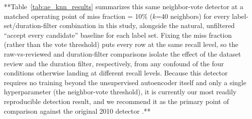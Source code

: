 \documentclass[preprint,NumberedRefs]{JASAnew}
\begin{document}
**Table~\ref{tab:ae_knn_results} summarizes this same neighbor-vote detector at a
matched operating point of miss fraction = 10\% ($k$=40 neighbors) for every
label-set/duration-filter combination in this study, alongside the natural,
unfiltered ``accept every candidate'' baseline for each label set. Fixing
the miss fraction (rather than the vote threshold) puts every row at the
same recall level, so the raw-vs-reviewed and duration-filter comparisons
isolate the effect of the dataset review and the duration filter,
respectively, from any confound of the four conditions otherwise landing at
different recall levels. Because this detector requires no training beyond the unsupervised
autoencoder itself and only a single hyperparameter (the neighbor-vote
threshold), it is currently our most readily reproducible detection result, and
we recommend it as the primary point of comparison against the original 2010
detector \cite{thode2012automated}.**
\end{document}
